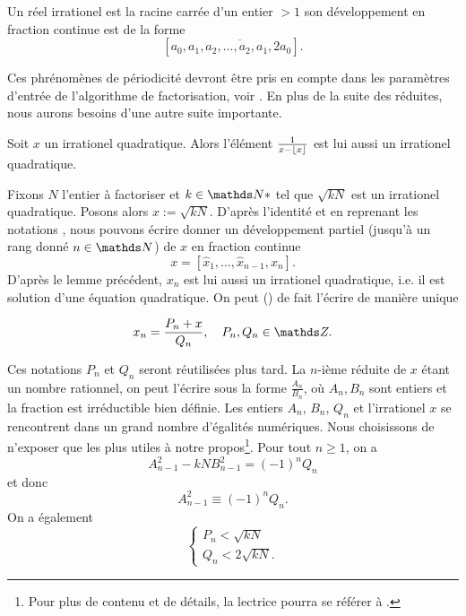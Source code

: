 \begin{theoreme}[Legendre, 1798]
	Un réel irrationel est la racine carrée d'un entier $>1$ \ssi son
	développement en fraction continue est de la forme \[[a_0, \overline{a_1,
	a_2, \dots, a_2, a_1, 2a_0}].\]
\end{theoreme}

Ces phrénomènes de périodicité devront être pris en compte dans les paramètres
d'entrée de l'algorithme de factorisation, voir . En plus de la suite
des réduites, nous aurons besoins d'une autre suite importante.

\begin{lemme}
	Soit $x$ un irrationel quadratique. Alors l'élément $\frac{1}{x - \lfloor x\rfloor}$
	est lui aussi un irrationel quadratique. 
\end{lemme}

Fixons $N$ l'entier à factoriser et $k\in \N*$ tel que $\sqrt{kN}$ est un
irrationel quadratique. Posons alors $x := \sqrt{kN}$. D'après l'identité
\label{egalite-reduite} et en reprenant les notations \label{notations}, nous
pouvons écrire donner un développement partiel (jusqu'à un rang donné $n\in
\N$) de $x$ en fraction continue \[x = [\hat{x}_1, \dots, \hat{x}_{n-1},
x_n].\] D'après le lemme précédent, $x_n$ est lui aussi un irrationel
quadratique, i.e. il est solution d'une équation quadratique. On peut
() de fait l'écrire de manière unique 

\begin{equation}
	x_n = \frac{P_n + x}{Q_n}, \quad P_n, Q_n \in \Z.
\end{equation}

Ces notations $P_n$ et $Q_n$ seront réutilisées plus tard. La $n$-ième réduite
de $x$ étant un nombre rationnel, on peut l'écrire sous la forme
$\frac{A_n}{B_n}$, où $A_n, B_n$ sont entiers et la fraction est irréductible
bien définie. Les entiers $A_n$, $B_n$, $Q_n$ et l'irrationel $x$ se
rencontrent dans un grand nombre d'égalités numériques. Nous choisissons de
n'exposer que les plus utiles à notre propos\footnote{Pour plus de contenu et
de détails, la lectrice pourra se référer à .}. Pour tout $n\geqslant
1$, on a \[A_{n-1}^2 - kN B_{n-1}^2 = (-1)^n Q_n\] et donc
\begin{equation}
	A_{n-1}^2 \equiv (-1)^n Q_n.
\end{equation}
On a également
\begin{equation}
	\begin{cases}
		P_n < \sqrt{kN} \\
		Q_n < 2\sqrt{kN}.
	\end{cases}
\end{equation}
